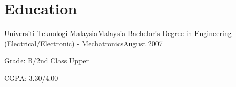 \section{\textbf{Education}}
\vspace{-0.4mm}
\resumeSubHeadingListStart

\resumeSubheading
{Universiti Teknologi Malaysia}{Malaysia}
{Bachelor's Degree in Engineering (Electrical/Electronic) - Mechatronics}{August 2007}
\resumeItemListStart
\item Grade: B/2nd Class Upper
\item CGPA: 3.30/4.00
\resumeItemListEnd

\resumeSubHeadingListEnd
